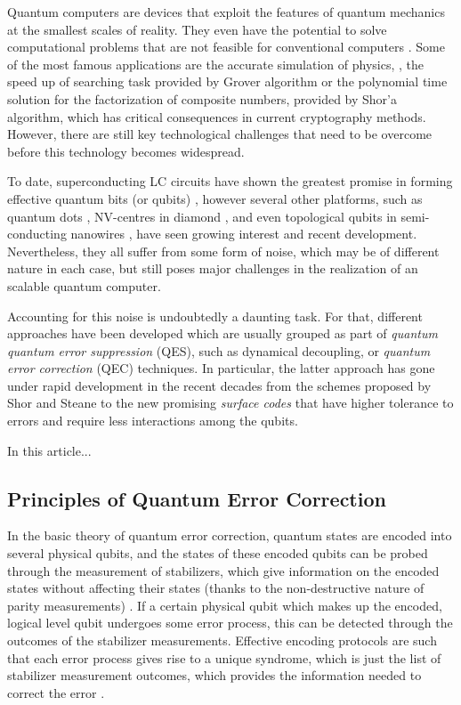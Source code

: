 
Quantum computers are devices that exploit the features of quantum mechanics at
the smallest scales of reality. They even have the potential to solve
computational problems that are not feasible for conventional computers
\cite{nielsen_chuang_2010}. Some of the most famous
applications are the accurate simulation of physics,
\cite{feynman82_simul_physic_with_comput}, the speed up of searching task
provided by Grover algorithm\cite{Grover_1996} or the polynomial time solution
for the factorization of composite numbers, provided by Shor'a
algorithm\cite{Shor_1997}, which has critical consequences in current cryptography
methods. However, there are still key technological challenges that need to be
overcome before this technology becomes widespread.

To date, superconducting LC circuits have shown the greatest promise in forming
effective quantum bits (or qubits) \cite{Rol_2019}
\cite{barends14_super_quant_circuit_at_surfac}, however several other platforms,
such as quantum dots \cite{huang19_fidel_bench_two_qubit_gates_silic}
\cite{Lawrie_2020}, NV-centres in diamond \cite{Taminiau_2014}, and even
topological qubits in semi-conducting nanowires \cite{Mourik_2012}, have seen
growing interest and recent development. Nevertheless, they all suffer from some
form of noise, which may be of different nature in each case, but still poses
major challenges in the realization of an scalable quantum computer.

Accounting for this noise is undoubtedly a daunting task. For that, different
approaches have been developed which are usually grouped as part of
\textit{quantum quantum error suppression} (QES), such as dynamical decoupling,
or \textit{quantum error correction} (QEC) techniques. In particular, the latter
approach has gone under rapid development in the recent decades from the schemes
proposed by Shor\cite{Shor_1995_QEC} and Steane \cite{Steane_1996_QEC} to the
new promising \textit{surface codes} \cite{fowler12_surfac_codes} that have
higher tolerance to errors and require less interactions among the qubits.

In this article...

\subsection{Principles of Quantum Error Correction}
In the basic theory of quantum error correction, quantum states are encoded into
several physical qubits, and the states of these encoded qubits can be probed
through the measurement of stabilizers, which give information on the encoded
states without affecting their states (thanks to the non-destructive nature of
parity measurements) \cite{nielsen_chuang_2010}. If a certain physical qubit
which makes up the encoded, logical level qubit undergoes some error process,
this can be detected through the outcomes of the stabilizer measurements.
Effective encoding protocols are such that each error process gives rise to a
unique syndrome, which is just the list of stabilizer measurement outcomes,
which provides the information needed to correct the error \cite{fowler12_surfac_codes}.

